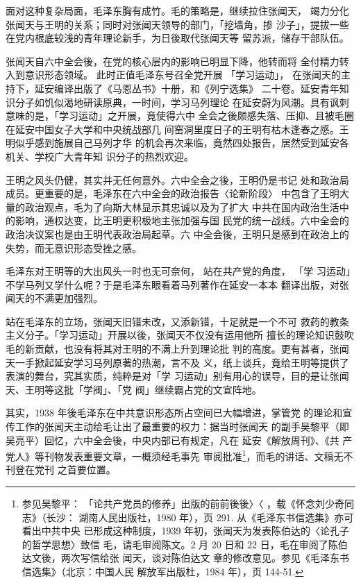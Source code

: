 面对这种复杂局面，毛泽东胸有成竹。毛的策略是，继续拉住张闻天，
竭力分化张闻天与王明的关系；同时对张闻天领导的部门，「挖墙角，掺
沙子」，提拔一些在党内根底较浅的青年理论新手，为日後取代张闻天等
留苏派，储存干部队伍。

张闻天自六中全会後，在党的核心层内的影响已明显下降，他转而将
全付精力转入到意识形态领域。
此时正值毛泽东号召全党开展
「学习运动」，
在张闻天的主持下，延安编译出版了《马恩丛书》十册，和《列宁选集》
二十卷。延安青年知识分子如饥似渴地研读原典，一时间，学习马列理论
在延安蔚为风潮。具有讽刺意味的是，「学习运动」之开展，竟使得六中
全会之後颇感失落、压抑、且被毛圈在延安中国女子大学和中央统战部几
间窑洞里度日子的王明有枯木逢春之感。王明似乎感到施展自己马列才华
的机会再次来临，竟然四处报告，居然受到延安各机关、学校广大青年知
识分子的热烈欢迎。
 
王明之风头仍健，其实并无任何意外。六中全会之後，王明仍是书记
处和政治局成员。更重要的是，毛泽东在六中全会的政治报告〈论新阶段〉
中包含了王明大量的政治观点，毛为了向斯大林显示其忠诚以及为了扩大
中共在国内政治生活中的影响，通权达变，比王明更积极地主张加强与国
民党的统一战线。六中全会的政治决议案也是由王明代表政治局起草。六
中全会後，王明只是感到在政治上的失势，而无意识形态受挫之感。
 
毛泽东对王明等的大出风头一时也无可奈何，
站在共产党的角度，
「学
习运动」不学马列又学什么呢？于是毛泽东眼看着马列著作在延安一本本
翻译出版，对张闻天的不满更加强烈。
 
站在毛泽东的立场，张闻天旧错未改，又添新错，十足就是一个不可
救药的教条主义分子。「学习运动」开展以後，张闻天不仅没有运用他所
擅长的理论知识鼓吹毛的新贡献，也没有将其对王明的不满上升到理论批
判的高度。更有甚者，张闻天一手掀起延安学习马列原著的热潮，言不及
义，纸上谈兵，竟给王明等提供了表演的舞台，究其实质，纯粹是对「学
习运动」别有用心的误导，目的是让张闻天、王明等这批「学阀」、「党
阀」继续霸占党的文宣阵地。
 
其实，1938 年後毛泽东在中共意识形态所占空间已大幅增进，掌管党 的理论和宣
传工作的张闻天主动给毛让出了最重要的权力：据当时张闻天 的副手吴黎平（即
吴亮平）回忆，六中全会後，中央内部已有规定，凡在 延安《解放周刊》、《共
产党人》等刊物发表重要文章，一概须经毛事先 审阅批准\footnote{参见吴黎平：
「论共产党员的修养」出版的前前後後〉〈 ，载《怀念刘少奇同志》（长沙：
湖南人民出版社，1980 年），页 291. 从《毛泽东书信选集》亦可看出中共中央
已形成这种制度，1939 年初，张闻天为发表陈伯达的〈论孔子 的哲学思想〉致信
毛，请毛审阅陈文。2 月 20 日和 22 日，毛在审阅了陈伯达文後，两次写信给张
闻天，谈对陈伯达文 章的修改意见。参见《毛泽东书信选集》（北京：中国人民
解放军出版杜，1984 年），页 144-51.  }，而毛的讲话、文稿无不刊登在党刊
之首要位置。

